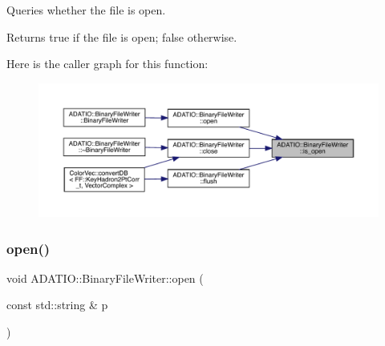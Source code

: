 Queries whether the file is open. 

\begin{DoxyReturn}{Returns}
true if the file is open; false otherwise. 
\end{DoxyReturn}
Here is the caller graph for this function\+:\nopagebreak
\begin{figure}[H]
\begin{center}
\leavevmode
\includegraphics[width=350pt]{dc/d11/classADATIO_1_1BinaryFileWriter_a891f81b41b18e3ba86c7e8af134b603e_icgraph}
\end{center}
\end{figure}
\mbox{\label{classADATIO_1_1BinaryFileWriter_a943ba19816b403b36f50f72740ea856a}} 
\subsubsection{\texorpdfstring{open()}{open()}\hspace{0.1cm}{\footnotesize\ttfamily [1/2]}}
{\footnotesize\ttfamily void A\+D\+A\+T\+I\+O\+::\+Binary\+File\+Writer\+::open (\begin{DoxyParamCaption}\item[{const std\+::string \&}]{p }\end{DoxyParamCaption})}

